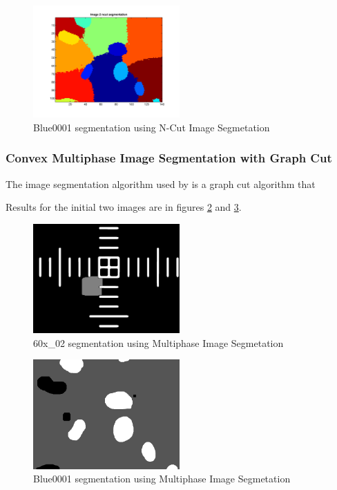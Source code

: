 \documentclass{article}
\begin{document}
\begin{figure}
\centering
\includegraphics[width=0.5\textwidth]{figures/Blue0001_gc1.pdf}
\caption{Blue0001 segmentation using N-Cut Image Segmetation}
\label{fig:gc1_2}
\end{figure}






\pagebreak
\subsubsection*{Convex Multiphase Image Segmentation with Graph Cut}

The image segmentation algorithm used by \cite{jun} is a graph cut algorithm that 

Results for the initial two images are in figures \ref{fig:gc2_1} and \ref{fig:gc2_2}.

\pagebreak
\begin{figure}
\centering
\includegraphics[width=0.5\textwidth]{figures/60x_02_gc2.png}
\caption{60x\_02 segmentation using Multiphase Image Segmetation}
\label{fig:gc2_1}
\end{figure}

\begin{figure}
\centering
\includegraphics[width=0.5\textwidth]{figures/Blue0001_gc2.png}
\caption{Blue0001 segmentation using Multiphase Image Segmetation}
\label{fig:gc2_2}
\end{figure}
\end{document}
